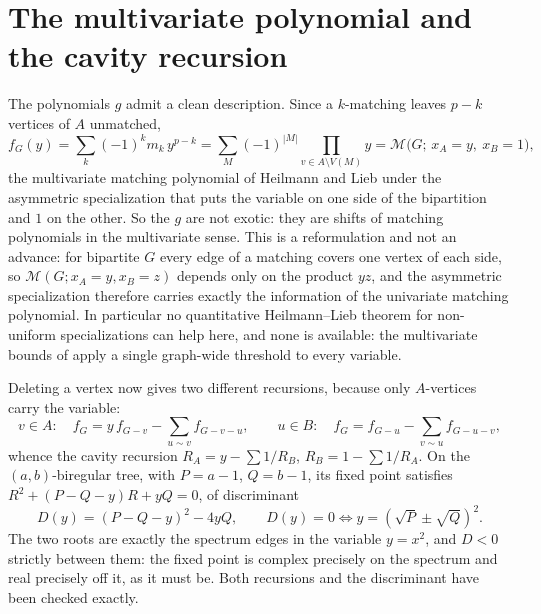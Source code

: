 \documentclass[11pt]{article}
\theoremstyle{remark}
\begin{document}
\section{The multivariate polynomial and the cavity recursion}

The polynomials $g$ admit a clean description. Since a $k$-matching leaves $p-k$
vertices of $A$ unmatched,
\begin{equation}\label{eq:multivar}
f_G(y)=\sum_{k}(-1)^k m_k\,y^{p-k}
=\sum_{M}(-1)^{|M|}\prod_{v\in A\setminus V(M)}y
=\mathcal M\bigl(G;\,x_A=y,\ x_B=1\bigr),
\end{equation}
the multivariate matching polynomial of Heilmann and Lieb under the asymmetric
specialization that puts the variable on one side of the bipartition and $1$ on
the other. So the $g$ are not exotic: they are shifts of matching polynomials in
the multivariate sense. This is a reformulation and not an advance: for
bipartite $G$ every edge of a matching covers one vertex of each side, so
$\mathcal M(G;x_A=y,x_B=z)$ depends only on the product $yz$, and the asymmetric
specialization therefore carries exactly the information of the univariate
matching polynomial. In particular no quantitative Heilmann--Lieb theorem for
non-uniform specializations can help here, and none is available: the
multivariate bounds of \cite{HL} apply a single graph-wide threshold to every
variable.

Deleting a vertex now gives two different recursions, because only $A$-vertices
carry the variable:
\[
v\in A:\quad f_G=y\,f_{G-v}-\!\!\sum_{u\sim v}\!f_{G-v-u},
\qquad
u\in B:\quad f_G=f_{G-u}-\!\!\sum_{v\sim u}\!f_{G-u-v},
\]
whence the cavity recursion
$R_A=y-\sum1/R_B$, $R_B=1-\sum1/R_A$. On the $(a,b)$-biregular tree, with
$P=a-1$, $Q=b-1$, its fixed point satisfies $R^2+(P-Q-y)R+yQ=0$, of
discriminant
\[
D(y)=(P-Q-y)^2-4yQ,
\qquad
D(y)=0\iff y=(\sqrt P\pm\sqrt Q)^2 .
\]
The two roots are exactly the spectrum edges in the variable $y=x^2$, and $D<0$
strictly between them: the fixed point is complex precisely on the spectrum and
real precisely off it, as it must be. Both recursions and the discriminant have
been checked exactly.
\end{document}

